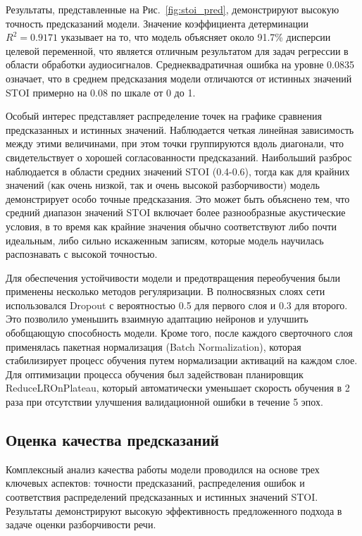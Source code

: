 \documentclass[oneside, final, 14pt]{extarticle}
\begin{document}
Результаты, представленные на Рис.~\ref{fig:stoi_pred}, демонстрируют высокую точность предсказаний модели. Значение коэффициента детерминации $R^2=0.9171$ указывает на то, что модель объясняет около 91.7\% дисперсии целевой переменной, что является отличным результатом для задач регрессии в области обработки аудиосигналов. Среднеквадратичная ошибка на уровне 0.0835 означает, что в среднем предсказания модели отличаются от истинных значений STOI примерно на 0.08 по шкале от 0 до 1.

Особый интерес представляет распределение точек на графике сравнения предсказанных и истинных значений. Наблюдается четкая линейная зависимость между этими величинами, при этом точки группируются вдоль диагонали, что свидетельствует о хорошей согласованности предсказаний. Наибольший разброс наблюдается в области средних значений STOI (0.4-0.6), тогда как для крайних значений (как очень низкой, так и очень высокой разборчивости) модель демонстрирует особо точные предсказания. Это может быть объяснено тем, что средний диапазон значений STOI включает более разнообразные акустические условия, в то время как крайние значения обычно соответствуют либо почти идеальным, либо сильно искаженным записям, которые модель научилась распознавать с высокой точностью.

Для обеспечения устойчивости модели и предотвращения переобучения были применены несколько методов регуляризации. В полносвязных слоях сети использовался Dropout с вероятностью 0.5 для первого слоя и 0.3 для второго. Это позволило уменьшить взаимную адаптацию нейронов и улучшить обобщающую способность модели. Кроме того, после каждого сверточного слоя применялась пакетная нормализация (Batch Normalization), которая стабилизирует процесс обучения путем нормализации активаций на каждом слое. Для оптимизации процесса обучения был задействован планировщик ReduceLROnPlateau, который автоматически уменьшает скорость обучения в 2 раза при отсутствии улучшения валидационной ошибки в течение 5 эпох.


\subsection{Оценка качества предсказаний}

Комплексный анализ качества работы модели проводился на основе трех ключевых аспектов: точности предсказаний, распределения ошибок и соответствия распределений предсказанных и истинных значений STOI. Результаты демонстрируют высокую эффективность предложенного подхода в задаче оценки разборчивости речи.
\end{document}
